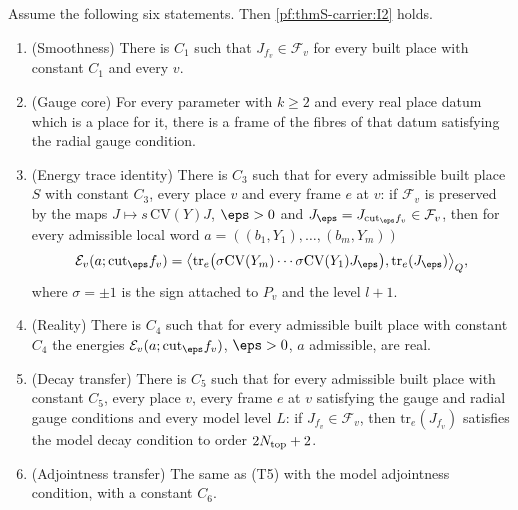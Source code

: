 \begin{theorem}\label{pf:thmS-carrier:openQQ}
Assume the following six statements. Then \ref{pf:thmS-carrier:I2} holds.
\begin{enumerate}[label=(T\arabic*)]
\item (Smoothness) There is $C_1$ such that $J_{f_v}\in\mathcal F_v$ for every built place with constant $C_1$ and every $v$.
\item (Gauge core) For every parameter with $k\ge2$ and every real place datum which is a place for it, there is a frame
  of the fibres of that datum satisfying the radial gauge condition.
\item (Energy trace identity) There is $C_3$ such that for every admissible built place $S$ with constant $C_3$, every place
  $v$ and every frame $e$ at $v$: if $\mathcal F_v$ is preserved by the maps $J\mapsto s\,\mathrm{CV}(Y)J$, $\eps>0$ and
  $J_\eps=J_{\mathrm{cut}_\eps f_v}\in\mathcal F_v$, then for every admissible local word
  $a=((b_1,Y_1),\dots,(b_m,Y_m))$
  \begin{equation}\label{eq:pf:thmS-carrier:energytrace}
  \mathcal E_v(a;\mathrm{cut}_\eps f_v)=\bigl\langle\mathrm{tr}_e\bigl(\sigma\mathrm{CV}(Y_m)\cdots\sigma\mathrm{CV}(Y_1)
  J_\eps\bigr),\mathrm{tr}_e(J_\eps)\bigr\rangle_Q,
  \end{equation}
  where $\sigma=\pm1$ is the sign attached to $P_v$ and the level $l+1$.
\item (Reality) There is $C_4$ such that for every admissible built place with constant $C_4$ the energies
  $\mathcal E_v(a;\mathrm{cut}_\eps f_v)$, $\eps>0$, $a$ admissible, are real.
\item (Decay transfer) There is $C_5$ such that for every admissible built place with constant $C_5$, every place $v$, every
  frame $e$ at $v$ satisfying the gauge and radial gauge conditions and every model level $L$: if $J_{f_v}\in\mathcal F_v$,
  then $\mathrm{tr}_e(J_{f_v})$ satisfies the model decay condition to order $2N_{\mathrm{top}}+2$.
\item (Adjointness transfer) The same as (T5) with the model adjointness condition, with a constant $C_6$.
\end{enumerate}
\end{theorem}

